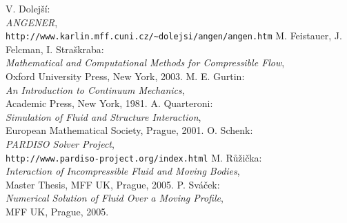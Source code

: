 \begin{thebibliography}{999}
  V. Dolejší: \\
  	{\em ANGENER}, \\
  	\verb+http://www.karlin.mff.cuni.cz/~dolejsi/angen/angen.htm+
  M. Feistauer, J. Felcman, I. Straškraba: \\
    {\em Mathematical and Computational Methods for Compressible Flow}, \\
    Oxford University Press, New York, 2003.
  M. E. Gurtin: \\
    {\em An Introduction to Continuum Mechanics}, \\
    Academic Press, New York, 1981.
  A. Quarteroni: \\
    {\em Simulation of Fluid and Structure Interaction}, \\
    European Mathematical Society, Prague, 2001.
  O. Schenk: \\
  	{\em PARDISO Solver Project}, \\
  	\verb+http://www.pardiso-project.org/index.html+
  M. Růžička: \\
    {\em Interaction of Incompressible Fluid and Moving Bodies}, \\
    Master Thesis, MFF UK, Prague, 2005.
  P. Sváček: \\
    {\em Numerical Solution of Fluid Over a Moving Profile}, \\
    MFF UK, Prague, 2005.
\end{thebibliography}
